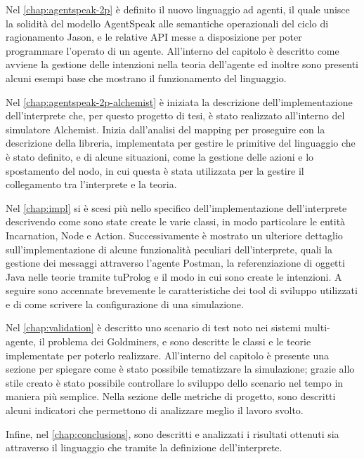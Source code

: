 Nel \cref{chap:agentspeak-2p} è definito il nuovo linguaggio ad agenti, il quale unisce la solidità del modello AgentSpeak alle semantiche operazionali del ciclo di ragionamento Jason, e le relative API messe a disposizione per poter programmare l'operato di un agente.
All'interno del capitolo è descritto come avviene la gestione delle intenzioni nella teoria dell'agente ed inoltre sono presenti alcuni esempi base che mostrano il funzionamento del linguaggio.

Nel \cref{chap:agentspeak-2p-alchemist} è iniziata la descrizione dell'implementazione dell'interprete che, per questo progetto di tesi, è stato realizzato all'interno del simulatore Alchemist.
Inizia dall'analisi del mapping per proseguire con la descrizione della libreria, implementata per gestire le primitive del linguaggio che è stato definito, e di alcune situazioni, come la gestione delle azioni e lo spostamento del nodo, in cui questa è stata utilizzata per la gestire il collegamento tra l'interprete e la teoria.

Nel \cref{chap:impl} si è scesi più nello specifico dell'implementazione dell'interprete descrivendo come sono state create le varie classi, in modo particolare le entità Incarnation, Node e Action.
Successivamente è mostrato un ulteriore dettaglio sull'implementazione di alcune funzionalità peculiari dell'interprete, quali la gestione dei messaggi attraverso l'agente Postman, la referenziazione di oggetti Java nelle teorie tramite tuProlog e il modo in cui sono create le intenzioni.
A seguire sono accennate brevemente le caratteristiche dei tool di sviluppo utilizzati e di come scrivere la configurazione di una simulazione.

Nel \cref{chap:validation} è descritto uno scenario di test noto nei sistemi multi-agente, il problema dei Goldminers, e sono descritte le classi e le teorie implementate per poterlo realizzare.
All'interno del capitolo è presente una sezione per spiegare come è stato possibile tematizzare la simulazione; grazie allo stile creato è stato possibile controllare lo sviluppo dello scenario nel tempo in maniera più semplice.
Nella sezione delle metriche di progetto, sono descritti alcuni indicatori che permettono di analizzare meglio il lavoro svolto.

Infine, nel \cref{chap:conclusions}, sono descritti e analizzati i risultati ottenuti sia attraverso il linguaggio che tramite la definizione dell'interprete.